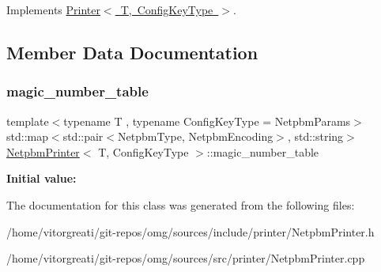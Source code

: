 Implements \mbox{\hyperlink{class_printer_a76931150a7fb3d4a69c3483bd08eed17}{Printer$<$ T, Config\+Key\+Type $>$}}.



\subsection{Member Data Documentation}
\mbox{\label{class_netpbm_printer_a8ca68fe204b021de766e45d6d71569c5}} 
\subsubsection{\texorpdfstring{magic\_number\_table}{magic\_number\_table}}
{\footnotesize\ttfamily template$<$typename T , typename Config\+Key\+Type  = Netpbm\+Params$>$ \\
std\+::map$<$std\+::pair$<$Netpbm\+Type, Netpbm\+Encoding$>$, std\+::string$>$ \mbox{\hyperlink{class_netpbm_printer}{Netpbm\+Printer}}$<$ T, Config\+Key\+Type $>$\+::magic\+\_\+number\+\_\+table}

{\bfseries Initial value\+:}
\begin{DoxyCode}{0}
\DoxyCodeLine{= \{}
\DoxyCodeLine{        \}}

\end{DoxyCode}


The documentation for this class was generated from the following files\+:\begin{DoxyCompactItemize}
\item 
/home/vitorgreati/git-\/repos/omg/sources/include/printer/Netpbm\+Printer.\+h\item 
/home/vitorgreati/git-\/repos/omg/sources/src/printer/Netpbm\+Printer.\+cpp\end{DoxyCompactItemize}
